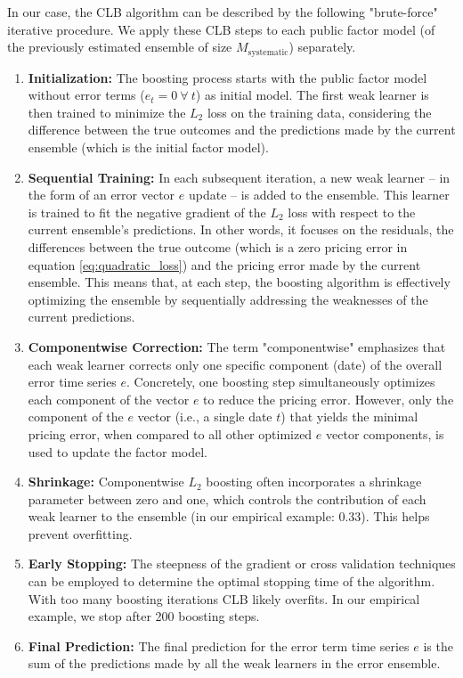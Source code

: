 \documentclass[12pt]{article}
\begin{document}
In our case, the CLB algorithm can be described by the following "brute-force" iterative procedure. 
We apply these CLB steps to each public factor model (of the previously estimated ensemble of size $M_{\mathrm{systematic}}$) separately.
\begin{enumerate}
	\item \textbf{Initialization:} 
	The boosting process starts with the public factor model without error terms ($e_t = 0 \ \forall \ t$) as initial model. 
	The first weak learner is then trained to minimize the $L_2$ loss on the training data, considering the difference between the true outcomes and the predictions made by the current ensemble (which is the initial factor model).
	\item \textbf{Sequential Training:} 
	In each subsequent iteration, a new weak learner -- in the form of an error vector $e$ update -- is added to the ensemble. 
	This learner is trained to fit the negative gradient of the $L_2$ loss with respect to the current ensemble's predictions. 
	In other words, it focuses on the residuals, the differences between the true outcome (which is a zero pricing error in equation \ref{eq:quadratic_loss}) and the pricing error made by the current ensemble.
	This means that, at each step, the boosting algorithm is effectively optimizing the ensemble by sequentially addressing the weaknesses of the current predictions.
	\item \textbf{Componentwise Correction:} 
	The term "componentwise" emphasizes that each weak learner corrects only one specific component (date) of the overall error time series $e$. 
	Concretely, one boosting step simultaneously optimizes each component of the vector $e$ to reduce the pricing error.
	However, only the component of the $e$ vector (i.e., a single date $t$) that yields the minimal pricing error, when compared to all other optimized $e$ vector components, is used to update the factor model.
	\item \textbf{Shrinkage:} 
	Componentwise $L_2$ boosting often incorporates a shrinkage parameter between zero and one, which controls the contribution of each weak learner to the ensemble (in our empirical example: 0.33). 
	This helps prevent overfitting.
	\item \textbf{Early Stopping:} 
	The steepness of the gradient or cross validation techniques can be employed to determine the optimal stopping time of the algorithm. 
	With too many boosting iterations CLB likely overfits.
	In our empirical example, we stop after 200 boosting steps.
	\item \textbf{Final Prediction:} 
	The final prediction for the error term time series $e$ is the sum of the predictions made by all the weak learners in the error ensemble.
\end{enumerate}
\end{document}

